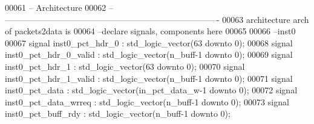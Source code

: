 \begin{DoxyCode}
00061 \textcolor{keyword}{-- Architecture}
00062 \textcolor{keyword}{-- ----------------------------------------------------------------------------}
00063 \textcolor{keywordflow}{architecture} arch \textcolor{keywordflow}{of} packets2data is
00064 \textcolor{keyword}{--declare signals,  components here}
00065 
00066 \textcolor{keyword}{--inst0}
00067 \textcolor{keywordflow}{signal} \textcolor{vhdlchar}{inst0_pct_hdr_0}        \textcolor{vhdlchar}{:} \textcolor{comment}{std\_logic\_vector}\textcolor{vhdlchar}{(}\textcolor{vhdllogic}{}\textcolor{vhdllogic}{63} \textcolor{keywordflow}{downto} \textcolor{vhdllogic}{}\textcolor{vhdllogic}{0}\textcolor{vhdlchar}{)};
00068 \textcolor{keywordflow}{signal} \textcolor{vhdlchar}{inst0_pct_hdr_0_valid}  \textcolor{vhdlchar}{:} \textcolor{comment}{std\_logic\_vector}\textcolor{vhdlchar}{(}\textcolor{vhdlchar}{n_buff}\textcolor{vhdlchar}{-}\textcolor{vhdllogic}{}\textcolor{vhdllogic}{1} \textcolor{keywordflow}{downto} \textcolor{vhdllogic}{}\textcolor{vhdllogic}{0}\textcolor{vhdlchar}{)};
00069 \textcolor{keywordflow}{signal} \textcolor{vhdlchar}{inst0_pct_hdr_1}        \textcolor{vhdlchar}{:} \textcolor{comment}{std\_logic\_vector}\textcolor{vhdlchar}{(}\textcolor{vhdllogic}{}\textcolor{vhdllogic}{63} \textcolor{keywordflow}{downto} \textcolor{vhdllogic}{}\textcolor{vhdllogic}{0}\textcolor{vhdlchar}{)};
00070 \textcolor{keywordflow}{signal} \textcolor{vhdlchar}{inst0_pct_hdr_1_valid}  \textcolor{vhdlchar}{:} \textcolor{comment}{std\_logic\_vector}\textcolor{vhdlchar}{(}\textcolor{vhdlchar}{n_buff}\textcolor{vhdlchar}{-}\textcolor{vhdllogic}{}\textcolor{vhdllogic}{1} \textcolor{keywordflow}{downto} \textcolor{vhdllogic}{}\textcolor{vhdllogic}{0}\textcolor{vhdlchar}{)};
00071 \textcolor{keywordflow}{signal} \textcolor{vhdlchar}{inst0_pct_data}         \textcolor{vhdlchar}{:} \textcolor{comment}{std\_logic\_vector}\textcolor{vhdlchar}{(}\textcolor{vhdlchar}{in_pct_data_w}\textcolor{vhdlchar}{-}\textcolor{vhdllogic}{}\textcolor{vhdllogic}{1} \textcolor{keywordflow}{downto} \textcolor{vhdllogic}{}\textcolor{vhdllogic}{0}\textcolor{vhdlchar}{)};
00072 \textcolor{keywordflow}{signal} \textcolor{vhdlchar}{inst0_pct_data_wrreq}   \textcolor{vhdlchar}{:} \textcolor{comment}{std\_logic\_vector}\textcolor{vhdlchar}{(}\textcolor{vhdlchar}{n_buff}\textcolor{vhdlchar}{-}\textcolor{vhdllogic}{}\textcolor{vhdllogic}{1} \textcolor{keywordflow}{downto} \textcolor{vhdllogic}{}\textcolor{vhdllogic}{0}\textcolor{vhdlchar}{)};
00073 \textcolor{keywordflow}{signal} \textcolor{vhdlchar}{inst0_pct_buff_rdy}     \textcolor{vhdlchar}{:} \textcolor{comment}{std\_logic\_vector}\textcolor{vhdlchar}{(}\textcolor{vhdlchar}{n_buff}\textcolor{vhdlchar}{-}\textcolor{vhdllogic}{}\textcolor{vhdllogic}{1} \textcolor{keywordflow}{downto} \textcolor{vhdllogic}{}\textcolor{vhdllogic}{0}\textcolor{vhdlchar}{)};

\end{DoxyCode}
